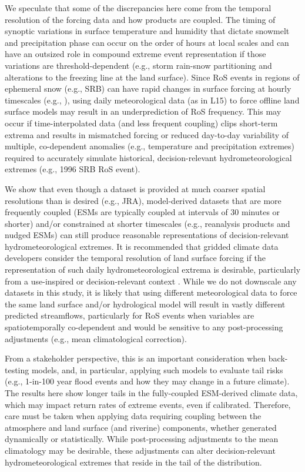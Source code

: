 \documentclass[draft]{agujournal2019}
\begin{document}
We speculate that some of the discrepancies here come from the temporal resolution of the forcing data and how products are coupled. The timing of synoptic variations in surface temperature and humidity that dictate snowmelt and precipitation phase can occur on the order of hours at local scales and can have an outsized role in compound extreme event representation if those variations are threshold-dependent (e.g., storm rain-snow partitioning and alterations to the freezing line at the land surface).
Since RoS events in regions of ephemeral snow (e.g., SRB) can have rapid changes in surface forcing at hourly timescales (e.g., \citet{leathers1998severe}), using daily meteorological data (as in L15) to force offline land surface models may result in an underprediction of RoS frequency. This may occur if time-interpolated data (and less frequent coupling) clips short-term extrema and results in mismatched forcing or reduced day-to-day variability of multiple, co-dependent anomalies (e.g., temperature and precipitation extremes) required to accurately simulate historical, decision-relevant hydrometeorological extremes (e.g., 1996 SRB RoS event).

We show that even though a dataset is provided at much coarser spatial resolutions than is desired (e.g., JRA), model-derived datasets that are more frequently coupled (ESMs are typically coupled at intervals of 30 minutes or shorter) and/or constrained at shorter timescales (e.g., reanalysis products and nudged ESMs) can still produce reasonable representations of decision-relevant hydrometeorological extremes. 
It is recommended that gridded climate data developers consider the temporal resolution of land surface forcing if the representation of such daily hydrometeorological extrema is desirable, particularly from a use-inspired or decision-relevant context \citep{Jagannathan2021}.
While we do not downscale any datasets in this study, it is likely that using different meteorological data to force the same land surface and/or hydrological model will result in vastly different predicted streamflows, particularly for RoS events when variables are spatiotemporally co-dependent and would be sensitive to any post-processing adjustments (e.g., mean climatological correction). 

From a stakeholder perspective, this is an important consideration when back-testing models, and, in particular, applying such models to evaluate tail risks (e.g., 1-in-100 year flood events and how they may change in a future climate). 
The results here show longer tails in the fully-coupled ESM-derived climate data, which may impact return rates of extreme events, even if calibrated. 
Therefore, care must be taken when applying data requiring coupling between the atmosphere and land surface (and riverine) components, whether generated dynamically or statistically. 
While post-processing adjustments to the mean climatology may be desirable, these adjustments can alter decision-relevant hydrometeorological extremes that reside in the tail of the distribution.
\end{document}
